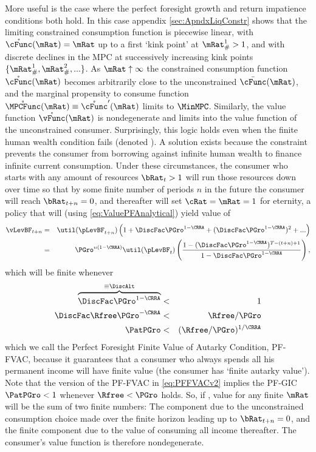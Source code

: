\documentclass[titlepage]{\econtex}\providecommand{\texname}{BufferStockTheory}
\begin{document}
More useful is the case where the perfect foresight growth and return impatience conditions both hold.  In this case appendix \ref{sec:ApndxLiqConstr} shows that the limiting constrained consumption function is piecewise linear, with $\mathring{\cFunc}(\mRat)=\mRat$ up to a first `kink point' at $\mRat_{\#}^{1}>1$, and with discrete declines in the MPC at successively increasing kink points $\{\mRat_{\#}^{1},\mRat_{\#}^{2},...\}$.  As $\mRat \uparrow \infty$ the constrained consumption function $\mathring{\cFunc}(\mRat)$ becomes arbitrarily close to the unconstrained $\bar{\cFunc}(\mRat)$, and the marginal propensity to consume function $\mathring{\MPCFunc}(\mRat) \equiv \mathring{\cFunc}^{\prime}(\mRat)$ limits to $\MinMPC$.  Similarly, the value function $\mathring{\vFunc}(\mRat)$ is nondegenerate and limits into the value function of the unconstrained consumer.  Surprisingly, this logic holds even when the finite human wealth condition fails (denoted ).  A solution exists because the constraint prevents the consumer from borrowing against infinite human wealth to finance infinite current consumption.  Under these circumstances, the consumer who starts with any amount of resources $\bRat_{t} > 1$ will run those resources down over time so that by some finite number of periods $n$ in the future the consumer will reach $\bRat_{t+n} = 0$, and thereafter will set $\cRat = \mRat = 1$ for eternity, a policy that will (using \eqref{eq:ValuePFAnalytical}) yield value of \hypertarget{PFFVAC}{}
\begin{eqnarray}
  \vLevBF_{t+n} & = & \util(\pLevBF_{t+n})\left(1+\DiscFac
    \PGro^{1-\CRRA}+(\DiscFac \PGro^{1-\CRRA})^{2}+...\right) \notag
  \\ & = & \PGro^{n(1-\CRRA)} \util(\pLevBF_{t})\left(\frac{1-(\DiscFac
      \PGro^{1-\CRRA})^{T-(t+n)+1}}{1-\DiscFac \PGro^{1-\CRRA}}\right),
  \notag
\end{eqnarray}
which will be finite whenever 
\begin{eqnarray}
   \overbrace{\DiscFac \PGro^{1-\CRRA} }^{\equiv \DiscAlt} & < & 1 \label{eq:PFFVAC}
\\ \DiscFac \Rfree \PGro^{-\CRRA} & < & \Rfree/\PGro \nonumber
\\ \PatPGro & < & (\Rfree/\PGro)^{1/\CRRA} \label{eq:PFFVACv2}
\end{eqnarray}
which we call the Perfect Foresight Finite Value of Autarky Condition, PF-FVAC, because it guarantees that a consumer who always spends all his permanent income will have finite value (the consumer has `finite autarky value').  Note that the version of the PF-FVAC in \eqref{eq:PFFVACv2} implies the PF-GIC $\PatPGro < 1$ whenever  $\Rfree < \PGro$ holds.  So, if , value for any finite $\mRat$ will be the sum of two finite numbers: The component due to the unconstrained consumption choice made over the finite horizon leading up to $\bRat_{t+n} = 0$, and the finite component due to the value of consuming all income thereafter.  The consumer's value function is therefore nondegenerate.
\end{document}
